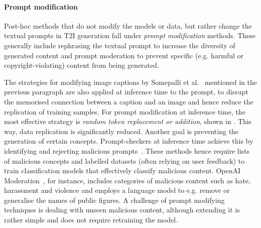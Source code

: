 \documentclass[conference,table]{IEEEtran}
\begin{document}
\paragraph{Prompt modification}\label{sec:mitigation-sanitising-prompt}
Post-hoc methods that do not modify the models or data, but rather change the textual prompts in T2I generation fall under \textit{prompt modification} methods.
These generally include rephrasing the textual prompt to increase the diversity of generated content and prompt moderation to prevent specific (e.g. harmful or copyright-violating) content from being generated. 

The strategies for modifying image captions by Somepalli et al.~\cite{somepalli_understanding_2023} mentioned in the previous paragraph are also applied at inference time to the prompt, to disrupt the memorised connection between a caption and an image and hence reduce the replication of training samples. 
For prompt modification at inference time, the most effective strategy is \textit{random token replacement or addition}, shown in .
This way, data replication is significantly reduced. 
Another goal is preventing the generation of certain concepts.
Prompt-checkers at inference time achieve this by identifying and rejecting malicious prompts~\cite{hanu_detoxify_2020,noauthor_openai_2023}.
These methods hence require lists of malicious concepts and labelled datasets (often relying on user feedback) to train classification models that effectively classify malicious content. 
OpenAI Moderation~\cite{noauthor_openai_2023}, for instance, includes categories of malicious content such as hate, harassment and violence and employs a language model to e.g. remove or generalise the names of public figures. 
A challenge of prompt modifying techniques is dealing with unseen malicious content, although extending it is rather simple and does not require retraining the model.
 
\end{document}
